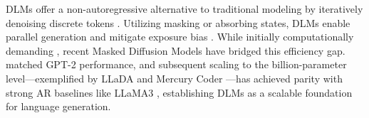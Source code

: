 \documentclass[11pt]{article}
\begin{document}



DLMs offer a non-autoregressive alternative to traditional modeling by iteratively denoising discrete tokens \citep{austin2021structured, li2022diffusion}. Utilizing masking or absorbing states, DLMs enable parallel generation and mitigate exposure bias \citep{zhou2024diffusion, zeng2025treediff}. While initially computationally demanding \citep{gulrajani2023search}, recent Masked Diffusion Models have bridged this efficiency gap. \citet{lou2024discrete} matched GPT-2 performance, and subsequent scaling to the billion-parameter level—exemplified by LLaDA \citep{llada} and Mercury Coder \citep{khanna2025mercury}—has achieved parity with strong AR baselines like LLaMA3 \citep{llama3}, establishing DLMs as a scalable foundation for language generation.
\end{document}
